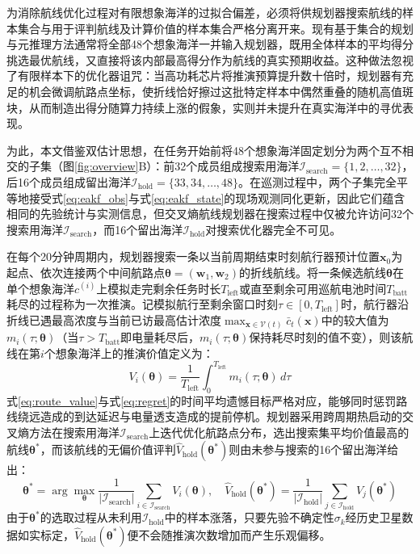 为消除航线优化过程对有限想象海洋的过拟合偏差，必须将供规划器搜索航线的样本集合与用于评判航线及计算价值的样本集合严格分离开来。现有基于集合的规划与元推理方法通常将全部48个想象海洋一并输入规划器，既用全体样本的平均得分挑选最优航线，又直接将该内部最高得分作为航线的真实预期收益\cite{russell1991right, lin2015metareasoning}。这种做法忽视了有限样本下的优化器诅咒\cite{smith2006curse}：当高功耗芯片将推演预算提升数十倍时，规划器有充足的机会微调航路点坐标，使折线恰好擦过这批特定样本中偶然重叠的随机高值斑块，从而制造出得分随算力持续上涨的假象，实则并未提升在真实海洋中的寻优表现。

为此，本文借鉴双估计思想\cite{vanhasselt2010double}，在任务开始前将48个想象海洋固定划分为两个互不相交的子集（图\ref{fig:overview}B）：前32个成员组成搜索用海洋$\mathcal{I}_{\text{search}} = \{1, 2, \dots, 32\}$，后16个成员组成留出海洋$\mathcal{I}_{\text{hold}} = \{33, 34, \dots, 48\}$。在巡测过程中，两个子集完全平等地接受式\eqref{eq:eakf_obs}与式\eqref{eq:eakf_state}的现场观测同化更新，因此它们蕴含相同的先验统计与实测信息，但交叉熵航线规划器在搜索过程中仅被允许访问32个搜索用海洋$\mathcal{I}_{\text{search}}$，而16个留出海洋$\mathcal{I}_{\text{hold}}$对搜索优化器完全不可见。

在每个20分钟周期内，规划器搜索一条以当前周期结束时刻航行器预计位置$\mathbf{x}_0$为起点、依次连接两个中间航路点$\bm{\theta} = (\mathbf{w}_1, \mathbf{w}_2)$的折线航线。将一条候选航线$\bm{\theta}$在单个想象海洋$c^{(i)}$上模拟走完剩余任务时长$T_{\text{left}}$或直至剩余可用巡航电池时间$T_{\text{batt}}$耗尽的过程称为一次推演。记模拟航行至剩余窗口时刻$\tau \in [0, T_{\text{left}}]$时，航行器沿折线已遇最高浓度与当前已访最高估计浓度$\max_{\mathbf{x}\in\mathcal{V}(t)} \bar{c}_t(\mathbf{x})$中的较大值为$m_i(\tau; \bm{\theta})$（当$\tau > T_{\text{batt}}$即电量耗尽后，$m_i(\tau; \bm{\theta})$保持耗尽时刻的值不变），则该航线在第$i$个想象海洋上的推演价值定义为：
\begin{equation}
  V_i(\bm{\theta}) = \frac{1}{T_{\text{left}}}\int_0^{T_{\text{left}}} m_i(\tau; \bm{\theta})\, d\tau
  \label{eq:route_value}
\end{equation}
式\eqref{eq:route_value}与式\eqref{eq:regret}的时间平均遗憾目标严格对应，能够同时惩罚路线绕远造成的到达延迟与电量透支造成的提前停机。规划器采用跨周期热启动的交叉熵方法\cite{deboer2005cem}在搜索用海洋$\mathcal{I}_{\text{search}}$上迭代优化航路点分布，选出搜索集平均价值最高的航线$\bm{\theta}^*$，而该航线的无偏价值评判$\hat{V}_{\text{hold}}(\bm{\theta}^*)$则由未参与搜索的16个留出海洋给出：
\begin{equation}
  \bm{\theta}^* = \arg\max_{\bm{\theta}} \frac{1}{|\mathcal{I}_{\text{search}}|}\sum_{i\in\mathcal{I}_{\text{search}}} V_i(\bm{\theta}), \quad
  \hat{V}_{\text{hold}}(\bm{\theta}^*) = \frac{1}{|\mathcal{I}_{\text{hold}}|}\sum_{j\in\mathcal{I}_{\text{hold}}} V_j(\bm{\theta}^*)
  \label{eq:split_eval}
\end{equation}
由于$\bm{\theta}^*$的选取过程从未利用$\mathcal{I}_{\text{hold}}$中的样本涨落，只要先验不确定性$\sigma_k$经历史卫星数据如实标定，$\hat{V}_{\text{hold}}(\bm{\theta}^*)$便不会随推演次数增加而产生乐观偏移。

